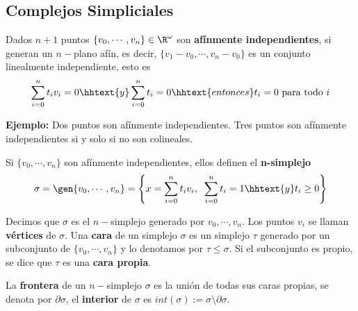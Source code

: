\documentclass{article}
\begin{document}
\newpage
\subsection{Complejos Simpliciales}
\begin{dfn}
    Dados $n+1$ puntos $\{v_{0},\cdots,v_{n}\}\in\R^{\omega}$ son \textbf{afínmente 
    independientes}, si generan un $n-$plano afín, es decir, $\{v_{1}-v_{0},\cdots,v_{n}-v_{0}\}$
    es un conjunto linealmente independiente, esto es
    \begin{equation*}
        \sum_{i=0}^{n}t_{i}v_{i}=0\hhtext{y}\sum_{i=0}^{n}t_{i}=0
        \hhtext{entonces}t_{i}=0\text{ para todo }i
    \end{equation*}
\end{dfn}

\vspace{2mm}
\noindent\textbf{Ejemplo:} Dos puntos son afínmente independientes. Tres puntos son afínmente 
independientes si y solo si no son colineales.

\vspace{2mm}
\begin{dfn}
    Si $\{v_{0},\cdots,v_{n}\}$ son afínmente independientes, ellos definen el \textbf{n-simplejo}
    \begin{equation*}
        \sigma=\gen{v_{0},\cdots,v_{n}}=\left\{x=\sum_{i=0}^{n}t_{i}v_{i},\hspace{2mm}
        \sum_{i=0}^{n}t_{i}=1\hhtext{y}t_{i}\geq0\right\}
    \end{equation*}
\end{dfn}

\noindent Decimos que $\sigma$ es el $n-$simplejo generado por $v_{0},\cdots,v_{n}$. Los puntos 
$v_{i}$ se llaman \textbf{vértices} de $\sigma$. Una \textbf{cara} de un simplejo $\sigma$ es 
un simplejo $\tau$ generado por un subconjunto de $\{v_{0},\cdots,v_{n}\}$ y lo denotamos por 
$\tau\leq\sigma$. Si el subconjunto es propio, se dice que $\tau$ es una \textbf{cara propia}.

\vspace{2mm}
\noindent La \textbf{frontera} de un $n-$simplejo $\sigma$ es la unión de todas sus caras propias, 
se denota por $\partial\sigma$, el \textbf{interior} de $\sigma$ es $int(\sigma):=
\sigma\setminus\partial\sigma$.

\begin{center}
\end{center}
\end{document}
